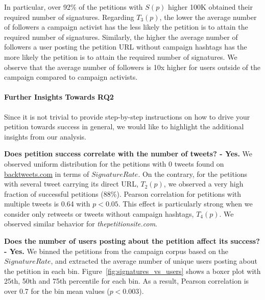 In particular, over 92\% of the petitions with $S(p)$ higher 100K obtained their required number of signatures.
Regarding $T_3(p)$, the lower the average number of followers a campaign activist has the less likely the petition is to attain the required number of signatures.
Similarly, the higher the average number of followers a user posting the petition URL without campaign hashtags has the more likely the petition is to attain the required number of signatures.
We observe that the average number of followers is 10x higher for users outside of the campaign compared to campaign activists. 

\paragraph{Further Insights Towards RQ2}
Since it is not trivial to provide step-by-step instructions on how to drive your petition towards success in general, we would like to highlight the additional insights from our analysis.


\textbf{Does petition success correlate with the number of tweets? - Yes.} We observed uniform distribution for the petitions with 0 tweets found on \url{backtweets.com} in terms of $SignatureRate$. On the contrary, for the petitions with several tweet carrying its direct URL, $T_2(p)$, we observed a very high fraction of successful petitions (88\%). Pearson correlation for petitions with multiple tweets is 0.64 with \(p < 0.05\). This effect is particularly strong when we consider only retweets or tweets without campaign hashtags, $T_4(p)$. We observed similar behavior for \textit{thepetitionsite.com}.

\textbf{Does the number of users posting about the petition affect its success? - Yes.} We binned the petitions from the campaign corpus based on the $SignatureRate$, and extracted the average number of unique users posting about the petition in each bin. Figure~\ref{fig:signatures_vs_users} shows a boxer plot with 25th, 50th and 75th percentile for each bin. As a result, Pearson correlation is over 0.7 for the bin mean values (\(p < 0.003\)).

